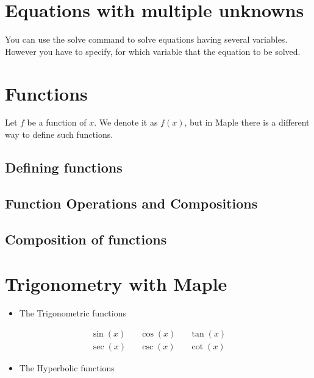 \documentclass[
]{book}
\providecommand{\tightlist}{%
  \setlength{\itemsep}{0pt}\setlength{\parskip}{0pt}}
\theoremstyle{definition}
\theoremstyle{definition}
\theoremstyle{definition}
\theoremstyle{definition}
\theoremstyle{remark}
\begin{document}
\section{Equations with multiple unknowns}\label{equations-with-multiple-unknowns}

You can use the solve command to solve equations having several variables. However you have to specify, for which variable that the equation to be solved.

\section{Functions}\label{functions}

Let \(f\) be a function of \(x\). We denote it as \(f(x)\), but in Maple there is a different way to define such functions.

\subsection{Defining functions}\label{defining-functions}

\subsection{Function Operations and Compositions}\label{function-operations-and-compositions}

\subsection{Composition of functions}\label{composition-of-functions}

\section{Trigonometry with Maple}\label{trigonometry-with-maple}

\begin{itemize}
\tightlist
\item
  The Trigonometric functions
\end{itemize}

\[
\begin{aligned}
 \sin(x) && \cos(x) && \tan(x) \\
 \sec(x) && \csc(x) && \cot(x)
\end{aligned}
\]

\begin{itemize}
\tightlist
\item
  The Hyperbolic functions
\end{itemize}
\end{document}
